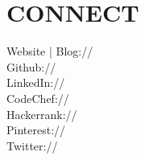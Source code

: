 \documentclass[]{resume-openfont}
\begin{document}
\begin{minipage}[t]{0.31\textwidth}

\section{CONNECT}
Website | Blog:// \href{https://diksha-rathi.github.io}{} \\
Github:// \href{https://github.com/Diksha-Rathi}{} \\
LinkedIn://  \href{https://www.linkedin.com/in/diksharathi}{} \\
CodeChef://  \href{https://www.codechef.com/users/codegirl1995}{} \\
Hackerrank://  \href{https://www.hackerrank.com/codegirl1995}{} \\
Pinterest:// \href{https://in.pinterest.com/diksha2895/}{} \\
Twitter://  \href{https://twitter.com/diksha_28795}{} \\

%
%

\end{minipage} 
\hfill
\end{document}
